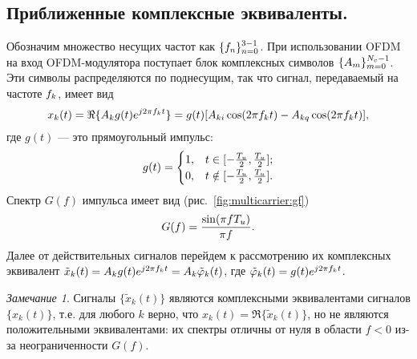 \documentclass{book}
\numberwithin{theorem}{chapter}
\numberwithin{statement}{chapter}
\numberwithin{lemma}{chapter}
\theoremstyle{definition}
\numberwithin{task}{chapter}
\theoremstyle{remark}
\numberwithin{example}{chapter}
\theoremstyle{definition}
\numberwithin{definition}{chapter}
\theoremstyle{remark}
\newtheorem{note}{Замечание}
\theoremstyle{remark}
\numberwithin{lyrics}{section}
\begin{document}
\subsection{Приближенные комплексные эквиваленты.}
Обозначим множество несущих частот как $\{f_n\}_{n=0}^{3-1}$. При использовании OFDM на вход OFDM-модулятора поступает блок комплексных символов $\{A_m\}_{m=0}^{N_c - 1}$. Эти символы распределяются по поднесущим, так что сигнал, передаваемый на частоте $f_k$, имеет вид
\begin{equation}
\notag
x_k(t) = \Re\{A_k g(t) e^{j2\pi f_k t} \} = g(t)[A_{ki}\cos(2\pi f_k t) - A_{kq} \cos(2\pi f_k t)],
\end{equation}
где $g(t)$ --- это прямоугольный импульс:
\begin{equation}
\notag
g(t) = 
\begin{cases}
1, &t \in [-\frac{T_u}{2}, \frac{T_u}{2}]; \\
0, &t \notin [-\frac{T_u}{2}, \frac{T_u}{2}].
\end{cases}
\end{equation}
Спектр $G(f)$ импульса имеет вид (рис.~\ref{fig:multicarrier:gf})
\begin{equation}
\notag
G(f) = \frac{\sin(\pi f T_u)}{\pi f}.
\end{equation}
Далее от действительных сигналов перейдем к рассмотрению их комплексных эквивалент $\tilde{x}_{k}(t) = A_k g(t) e^{j2\pi f_k t} = A_k \tilde{\varphi}_k(t)$, где $\tilde{\varphi}_k(t) = g(t) e^{j2\pi f_k t}$. 
\begin{note}
Сигналы $\{\tilde{x}_k(t)\}$ являются комплексными эквивалентами сигналов $\{x_k(t)\}$, т.е. для любого $k$ верно, что $x_k(t) = \Re\{\tilde{x}_k(t)\}$, но не являются положительными эквивалентами: их спектры отличны от нуля в области $f < 0$ из-за неограниченности $G(f)$. 
\end{note}
\end{document}
